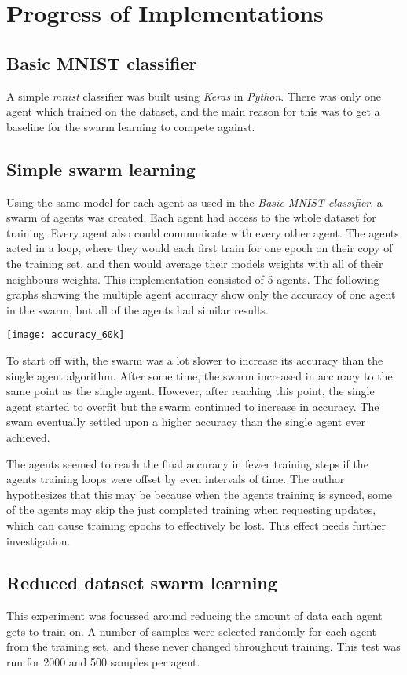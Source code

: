 \chapter{Progress of Implementations}

\section{Basic MNIST classifier}
A simple \emph{mnist} classifier was built using \emph{Keras} in \emph{Python}. There was only one agent which trained on the dataset, and the main reason for this was to get a baseline for the swarm learning to compete against.

\section{Simple swarm learning}
Using the same model for each agent as used in the \emph{Basic MNIST classifier}, a swarm of agents was created. Each agent had access to the whole dataset for training. Every agent also could communicate with every other agent. The agents acted in a loop, where they would each first train for one epoch on their copy of the training set, and then would average their models weights with all of their neighbours weights. This implementation consisted of 5 agents. The following graphs showing the multiple agent accuracy show only the accuracy of one agent in the swarm, but all of the agents had similar results.

\texttt{[image: accuracy\_60k]}

To start off with, the swarm was a lot slower to increase its accuracy than the single agent algorithm. After some time, the swarm increased in accuracy to the same point as the single agent. However, after reaching this point, the single agent started to overfit but the swarm continued to increase in accuracy. The swam eventually settled upon a higher accuracy than the single agent ever achieved.

The agents seemed to reach the final accuracy in fewer training steps if the agents training loops were offset by even intervals of time. The author hypothesizes that this may be because when the agents training is synced, some of the agents may skip the just completed training when requesting updates, which can cause training epochs to effectively be lost. This effect needs further investigation.

\section{Reduced dataset swarm learning}
This experiment was focussed around reducing the amount of data each agent gets to train on. A number of samples were selected randomly for each agent from the training set, and these never changed throughout training. This test was run for 2000 and 500 samples per agent.

